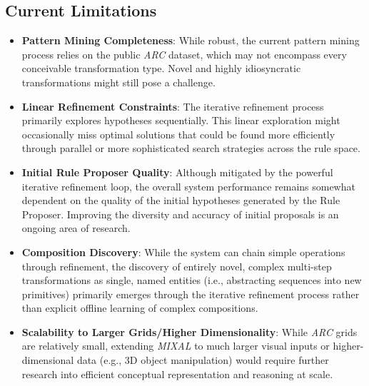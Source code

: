 \documentclass[12pt]{article}
\newcommand{\arc}{\textit{ARC}}
\newcommand{\MIXAL}{\textit{MIXAL}}
\begin{document}
\subsection{Current Limitations}
\begin{itemize}[noitemsep,topsep=0pt]
\item\textbf{Pattern Mining Completeness}: While robust, the current pattern mining process relies on the public \arc{} dataset, which may not encompass every conceivable transformation type. Novel and highly idiosyncratic transformations might still pose a challenge.
\item\textbf{Linear Refinement Constraints}: The iterative refinement process primarily explores hypotheses sequentially. This linear exploration might occasionally miss optimal solutions that could be found more efficiently through parallel or more sophisticated search strategies across the rule space.
\item\textbf{Initial Rule Proposer Quality}: Although mitigated by the powerful iterative refinement loop, the overall system performance remains somewhat dependent on the quality of the initial hypotheses generated by the Rule Proposer. Improving the diversity and accuracy of initial proposals is an ongoing area of research.
\item\textbf{Composition Discovery}: While the system can chain simple operations through refinement, the discovery of entirely novel, complex multi-step transformations as single, named entities (i.e., abstracting sequences into new primitives) primarily emerges through the iterative refinement process rather than explicit offline learning of complex compositions.
\item\textbf{Scalability to Larger Grids/Higher Dimensionality}: While \arc{} grids are relatively small, extending \MIXAL{} to much larger visual inputs or higher-dimensional data (e.g., 3D object manipulation) would require further research into efficient conceptual representation and reasoning at scale.
\end{itemize}
\end{document}
